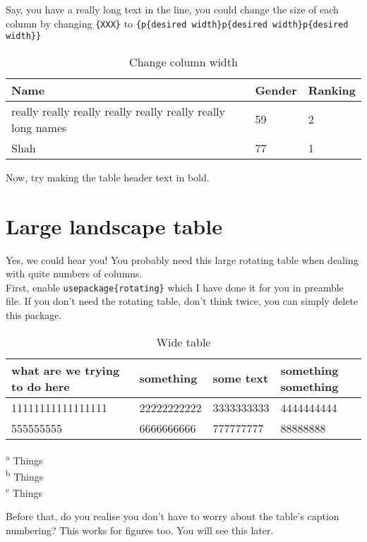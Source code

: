 Say, you have a really long text in the line, you could change the size of each column by changing \verb+{XXX}+ to \verb+{p{desired width}p{desired width}p{desired width}}+

\begin{table}[h!]
\caption{Change column width}
\begin{tabularx}{1\linewidth}{p{10.0cm}XX}    \addlinespace
    \toprule
    Name & Gender & Ranking \\
    \toprule
    really really really really really really really long names & 59 & 2 \\
    Shah & 77 & 1 \\
    \bottomrule
    \end{tabularx}
\end{table}

Now, try making the table header text in bold.

\section{Large landscape table}
Yes, we could hear you! You probably need this large rotating table when dealing with quite numbers of columns.\\

First, enable \verb+usepackage{rotating}+ which I have done it for you in preamble file. If you don't need the rotating table, don't think twice, you can simply delete this package.\\

\begin{sidewaystable}[h!]
    \centering
\caption{Wide table}
\begin{tabularx}{\textwidth}{XXXX}
    \toprule
what are we trying to do here & something  & some text & something something  \\
    \toprule
11111111111111111 & 22222222222  & 3333333333 & 4444444444  \\
555555555 & 6666666666  & 777777777 & 88888888  \\
\bottomrule
\end{tabularx}
\begin{flushleft}
\textsuperscript{a} Things \\
\textsuperscript{b} Things \\
\textsuperscript{c} Things \\
\end{flushleft}
\end{sidewaystable}

Before that, do you realise you don't have to worry about the table's caption numbering? This works for figures too. You will see this later.

